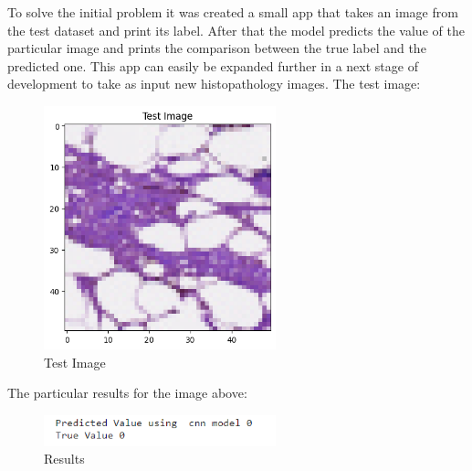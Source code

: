 To solve the initial problem it was created a small app that takes an image from the test dataset and print its label. After that the model predicts the value of the particular image and prints the comparison between the true label and the predicted one. This app can easily be expanded further in a next stage of development to take as input new histopathology images. 
The test image:
\begin{figure}[H]
    \centering
    \includegraphics[width=0.6\textwidth]{Images/test_image.png}
    \caption{Test Image}
    \label{fig:example}
\end{figure}
The particular results for the image above:
\begin{figure}[H]
    \centering
    \includegraphics[width=0.6\textwidth]{Images/results.png}
    \caption{Results}
    \label{fig:example}
\end{figure}